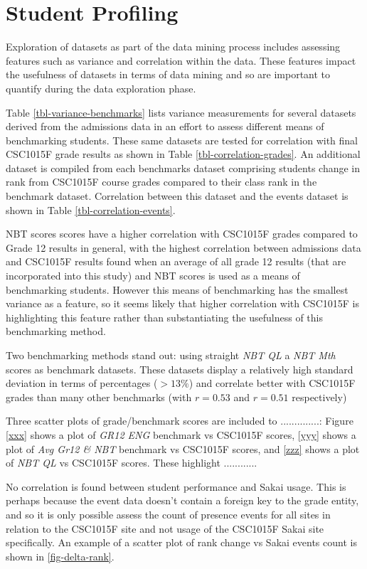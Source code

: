 

\section{Student Profiling}
Exploration of datasets as part of the data mining process includes assessing features such as variance and correlation within the data. These features impact the usefulness of datasets in terms of data mining and so are important to quantify during the data exploration phase.

Table \ref{tbl-variance-benchmarks} lists variance measurements for several datasets derived from the admissions data in an effort to assess different means of benchmarking students. These same datasets are tested for correlation with final CSC1015F grade results as shown in Table \ref{tbl-correlation-grades}. An additional dataset is compiled from each benchmarks dataset comprising students change in rank from CSC1015F course grades compared to their class rank in the benchmark dataset. Correlation between this dataset and the events dataset is shown in Table \ref{tbl-correlation-events}.

NBT scores scores have a higher correlation with CSC1015F grades compared to Grade 12 results in general, with the highest correlation between admissions data and CSC1015F results found when an average of all grade 12 results (that are incorporated into this study) and NBT scores is used as a means of benchmarking students. However this means of benchmarking has the smallest variance as a feature, so it seems likely that higher correlation with CSC1015F is highlighting this feature rather than substantiating the usefulness of this benchmarking method.

Two benchmarking methods stand out: using straight \textit{NBT QL} a \textit{NBT Mth} scores as benchmark datasets. These datasets display a relatively high standard deviation in terms of percentages ($> 13\%$) and correlate better with CSC1015F grades than many other benchmarks (with $r = 0.53$ and $r = 0.51$ respectively)

Three scatter plots of grade/benchmark scores are included to ..............: Figure \ref{xxx} shows a plot of \textit{GR12 ENG} benchmark vs CSC1015F scores, \ref{yyy} shows a plot of \textit{Avg Gr12 \& NBT} benchmark vs CSC1015F scores, and \ref{zzz} shows a plot of \textit{NBT QL} vs CSC1015F scores. These highlight ............

No correlation is found between student performance and Sakai usage. This is perhaps because the event data doesn't contain a foreign key to the grade entity, and so it is only possible assess the count of presence events for all sites in relation to the CSC1015F site and not usage of the CSC1015F Sakai site specifically. An example of a scatter plot of rank change vs Sakai events count is shown in \ref{fig-delta-rank}.









